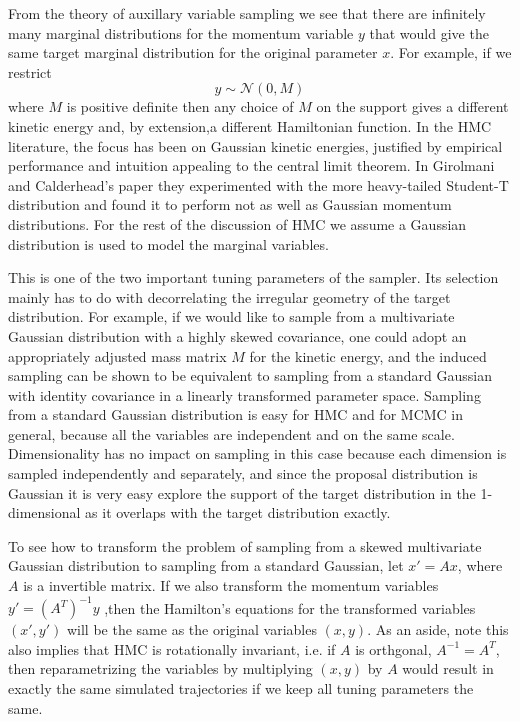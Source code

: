 \documentclass[]{report}
\begin{document}
From the theory of auxillary variable sampling we see that there are infinitely
many marginal distributions for the momentum variable $y$ that would give the
same target marginal distribution for the original parameter $x$. For example,
if we restrict 
\[ y \sim \mathcal{N}(0,M) \]
where $M$ is positive definite then any choice of $M$ on the support gives a
different kinetic energy and, by extension,a different Hamiltonian function. In the HMC
literature, the focus has been on Gaussian kinetic energies, 
justified by empirical performance and intuition appealing to the central limit
theorem. In Girolmani and Calderhead's paper \cite{girolami2011riemann} they experimented
with the more heavy-tailed Student-T distribution and found it to perform not as
well
as Gaussian momentum distributions. For the rest of the discussion of HMC we
assume a Gaussian distribution is used to model the marginal variables.

This is one of the two important tuning parameters of the sampler. Its
selection mainly has to do with decorrelating the irregular geometry of the
target distribution. For example, if we would like to sample from a multivariate
Gaussian distribution with a highly skewed covariance, one could adopt an
appropriately adjusted mass
matrix $M$ for the kinetic energy, and the induced sampling can be shown to be
equivalent to sampling from a standard Gaussian with identity covariance in a
linearly transformed parameter space. Sampling from a standard Gaussian
distribution is easy
for HMC and for MCMC in general, because all the variables are independent and on
the same scale. Dimensionality has no impact on sampling in this case because
each dimension is sampled independently and separately, and since the proposal
distribution is Gaussian it is very easy explore the support of the target
distribution in the 1-dimensional as it overlaps with the target distribution
exactly. 

To see how to transform the problem of sampling from a skewed multivariate
Gaussian distribution to sampling from a standard Gaussian, let $x' = Ax$, where $A$ is a invertible matrix. If we also
transform the momentum variables $y' = (A^T)^{-1}y$ ,then the
Hamilton's equations for the transformed variables $(x',y')$ will be the same as
the original variables $(x,y)$. As an aside, note this also implies that HMC is rotationally
invariant, i.e. if $A$ is orthgonal, $A^{-1} = A^T$, then reparametrizing the
variables by  multiplying $(x,y)$ by $A$ would result in exactly the same simulated
trajectories if we keep all tuning parameters the same.
\end{document}
